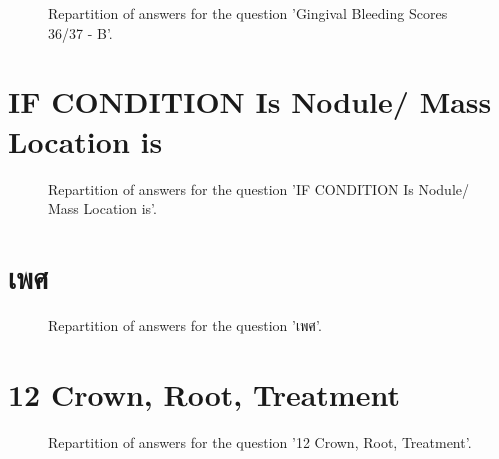 \documentclass[12pt]{article}
\begin{document}
\label{sec:63}


\begin{figure}[h!]
    \caption{\label{figure:q63-1}Repartition of answers for the question 'Gingival Bleeding Scores
36/37 - B'.}
\end{figure}



\clearpage{}
\section{IF CONDITION Is Nodule/ Mass
Location is}

\label{sec:173}


\begin{figure}[h!]
    \caption{\label{figure:q173-1}Repartition of answers for the question 'IF CONDITION Is Nodule/ Mass
Location is'.}
\end{figure}



\clearpage{}
\section{เพศ}

\label{sec:19}


\begin{figure}[h!]
    \caption{\label{figure:q19-1}Repartition of answers for the question 'เพศ'.}
\end{figure}



\clearpage{}
\section{12
Crown, Root, Treatment}

\label{sec:31}


\begin{figure}[h!]
    \caption{\label{figure:q31-1}Repartition of answers for the question '12
Crown, Root, Treatment'.}
\end{figure}
\end{document}
